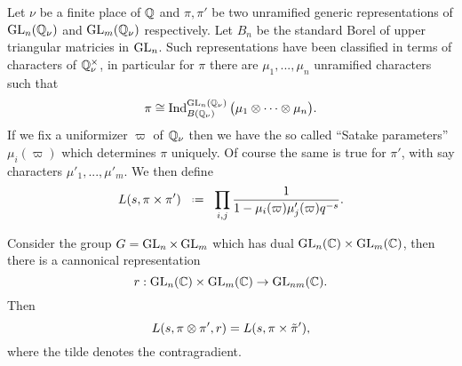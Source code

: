\begin{example}
	Let \(\nu\) be a finite place of \(\Q\) and \(\pi, \pi'\) be two unramified generic representations of \(\GL_n(\Q_\nu)\) and \(\GL_m(\Q_\nu)\) respectively. Let \(B_n\) be the standard Borel of upper triangular matricies in \(\operatorname{GL}_n\). Such representations have been classified 
	in terms of characters of \(\Q^\times_\nu\), in particular for \(\pi\) there are \(\mu_1, ..., \mu_n\) unramified characters such that 
	\[\pi \cong \Ind_{B(\Q_\nu)}^{\GL_n(\Q_\nu)} \big(\mu_1 \tensor \cdots \tensor \mu_n\big).\]
	If we fix a uniformizer \(\varpi\) of \(\Q_\nu\) then we have the so called ``Satake parameters'' \(\mu_i(\varpi)\) which determines \(\pi\) uniquely. Of course the same is true for \(\pi'\), with say characters \(\mu'_1, ..., \mu'_m\). We then define
	\[L(s, \pi\times \pi') \defeq \prod_{i,j} \frac{1}{1-\mu_i(\varpi)\mu'_j(\varpi)q^{-s}}.\]
	
	Consider the group \(G = \operatorname{GL}_n\times \operatorname{GL}_m\) which has dual \(\GL_n(\C) \times \GL_m(\C)\), then there is a cannonical representation 
	\[r:\GL_n(\C) \times \GL_m(\C) \to \GL_{nm}(\C). \]
	Then 
	\[L(s, \pi\otimes \pi', r) = L(s, \pi \times \tilde{\pi}'),\]
	where the tilde denotes the contragradient.
\end{example}

